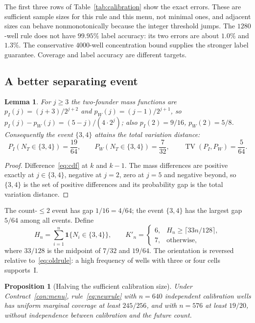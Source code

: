 \documentclass[11pt,a4paper]{article}
\theoremstyle{plain}
\newtheorem{proposition}[theorem]{Proposition}
\newtheorem{lemma}[theorem]{Lemma}
\theoremstyle{definition}
\theoremstyle{remark}
\newcommand{\TV}{\operatorname{TV}}
\newcommand{\ind}{\mathbf 1}
\begin{document}
The first three rows of Table~\ref{tab:calibration} show the exact errors. These are sufficient sample sizes for this rule and this menu, not minimal ones, and adjacent sizes can behave nonmonotonically because the integer threshold jumps. The $1280$-well rule does not have $99.95\%$ label accuracy: its two errors are about $1.0\%$ and $1.3\%$. The conservative $4000$-well concentration bound supplies the stronger label guarantee. Coverage and label accuracy are different targets.

\subsection{A better separating event}
\begin{lemma}\label{lem:mass}
For $j\ge3$ the two-founder mass functions are $p_I(j)=(j+3)/2^{j+2}$ and $p_W(j)=(j-1)/2^{j+1}$, so $p_I(j)-p_W(j)=(5-j)/(4\cdot2^j)$; also $p_I(2)=9/16$, $p_W(2)=5/8$. Consequently the event $\{3,4\}$ attains the total variation distance:
\begin{equation}\label{eq:tv}
P_I(N_T\in\{3,4\})=\frac{19}{64},\qquad P_W(N_T\in\{3,4\})=\frac{7}{32},\qquad \TV(P_I,P_W)=\frac{5}{64}.
\end{equation}
\end{lemma}
\begin{proof}
Difference~\eqref{eq:cdf} at $k$ and $k-1$. The mass differences are positive exactly at $j\in\{3,4\}$, negative at $j=2$, zero at $j=5$ and negative beyond, so $\{3,4\}$ is the set of positive differences and its probability gap is the total variation distance.
\end{proof}

The count-$\le2$ event has gap $1/16=4/64$; the event $\{3,4\}$ has the largest gap $5/64$ among all events. Define
\begin{equation}\label{eq:newrule}
H_n=\sum_{i=1}^n\ind\{N_i\in\{3,4\}\},\qquad K'_n=\begin{cases}6,&H_n\ge\lceil33n/128\rceil,\\7,&\text{otherwise},\end{cases}
\end{equation}
where $33/128$ is the midpoint of $7/32$ and $19/64$. The orientation is reversed relative to~\eqref{eq:oldrule}: a high frequency of wells with three or four cells supports~I.

\begin{proposition}[Halving the sufficient calibration size]\label{prop:tv}
Under Contract~\ref{con:menu}, rule~\eqref{eq:newrule} with $n=640$ independent calibration wells has uniform marginal coverage at least $245/256$, and with $n=576$ at least $19/20$, without independence between calibration and the future count.
\end{proposition}
\end{document}
